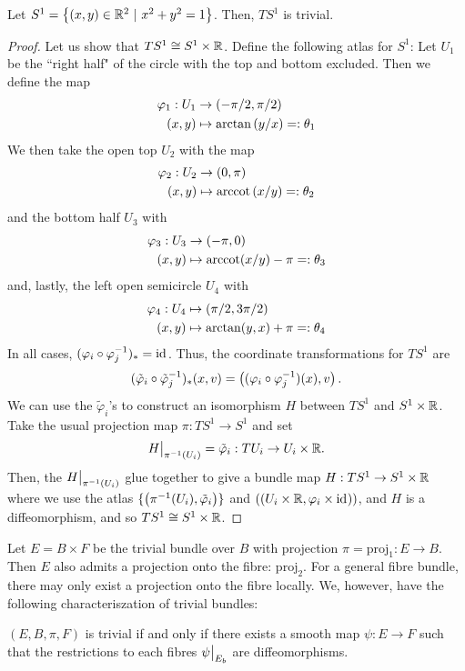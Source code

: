 \documentclass[main.tex]{subfiles}
\begin{document}
 \begin{exmp}
 Let $S^1 = \left\{ (x, y) \in \mathbb{R}^2 \ | \ x^2 + y^2 = 1 \right\}$. Then, $TS^1$ is trivial.
 
 \begin{proof}
 Let us show that $TS^1 \cong S^1 \times \mathbb{R}$. Define the following atlas for $S^1$: Let $U_1$ be the ``right half" of the circle with the top and bottom excluded. Then we define the map
 \begin{align*}
     \varphi_1 : U_1 &\to \left( -\pi/2, \pi/2 \right) \\
                 (x,y) &\mapsto \arctan\left( y/x \right)  =: \theta_1
\end{align*} We then take the open top $U_2$ with the map
\begin{align*}
    \varphi_2 : U_2 &\to \left( 0,\pi \right) \\
         (x,y) &\mapsto \text{arccot}\left( x/y \right) =: \theta_2
\end{align*}
and the bottom half $U_3$ with
\begin{align*}
    \varphi_3: U_3 &\to \left( -\pi, 0 \right) \\
     (x, y) &\mapsto \text{arccot}(x/y) - \pi =: \theta_3
\end{align*}
and, lastly, the left open semicircle $U_4$ with 
\begin{align*}
    \varphi_4: U_4 &\mapsto \left( \pi/2, 3\pi/2 \right) \\
     (x,y) &\mapsto \arctan(y,x) + \pi =: \theta_4
\end{align*}
In all cases, $(\varphi_i \circ \varphi_j^{-1})_* = \text{id}_{}$. Thus, the coordinate transformations for $TS^1$ are 
\[
(\tilde{\varphi}_i \circ \tilde{\varphi}_j^{-1})_*(x, v) = \left( (\varphi_i \circ \varphi_j^{-1})(x), v \right). 
\]
We can use the $\tilde{\varphi}_i$'s to construct an isomorphism $H$ between $TS^1$ and $S^1 \times \mathbb{R}$. Take the usual projection map $\pi: TS^1\to S^1$ and set 
\[
H\big|_{\pi^{-1}(U_i)} = \tilde{\varphi}_i : TU_i \to U_i \times \mathbb{R}.
\]
Then, the $H\big|_{\pi^{-1}(U_i)}$ glue together to give a bundle map $H: TS^1 \to S^1 \times \mathbb{R}$ where we use the atlas $\{\left(  \pi^{-1}(U_i), \tilde{\varphi}_i  \right) \}$ and $\left(  (U_i \times \mathbb{R}, \varphi_i \times \text{id}_{})  \right)$, and $H$ is a diffeomorphism, and so $TS^1 \cong S^1 \times \mathbb{R}$.
 \end{proof}
 \end{exmp}
 
 \begin{note}
 Let $E = B \times F$ be the trivial bundle over $B$ with projection $\pi = \text{proj}_1: E \to B$. Then $E$ also admits a projection onto the fibre: $\text{proj}_2$. For a general fibre bundle, there may only exist a projection onto the fibre locally. We, however, have the following characteriszation of trivial bundles: 
 \end{note}
 
 \begin{prop}
 $(E, B, \pi, F)$ is trivial if and only if there exists a smooth  map $\psi: E \to F$ such that the restrictions to each fibres $\psi\big|_{E_b}$ are diffeomorphisms.
 \end{prop}
 
\end{document}
